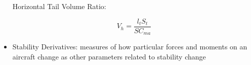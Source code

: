 \documentclass{journal}
\begin{document}
\begin{itemize}
		\subitem Horizontal Tail Volume Ratio:
		
		\begin{equation}
			V_h = \frac{l_tS_t}{SC_{ma}}
			\label{eqn:htail-ratio}
		\end{equation}
	
		\item Stability Derivatives: measures of how particular forces and moments on an aircraft change as other parameters related to stability change
		
	\end{itemize}
	
	
\end{document}
